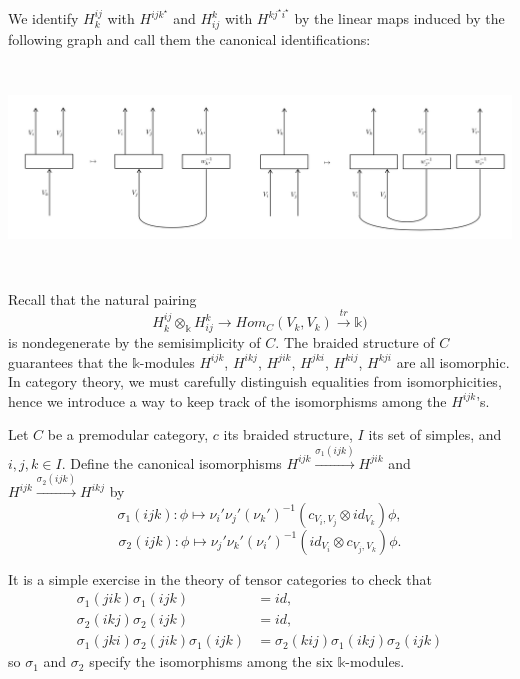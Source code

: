 \noindent We identify $H_{k}^{ij}$ with $H^{ijk^{\star}}$ and
$H_{ij}^{k}$ with $H^{kj^{\star}i^{\star}}$ by the linear maps
induced by the following graph and call them the canonical
identifications:
\begin{center}
  \includegraphics[height=5.5cm]{identification}
\end{center}
\noindent Recall that the natural pairing
$$H^{ij}_{k} \otimes_{\mathbb{k}} H_{ij}^{k} \to Hom_{C}(V_{k},V_{k}) \xrightarrow{tr} \mathbb{k})$$
is nondegenerate by the semisimplicity of $C$. The braided
structure of $C$ guarantees that the $\mathbb{k}$-modules
$H^{ijk}$, $H^{ikj}$, $H^{jik}$, $H^{jki}$, $H^{kij}$, $H^{kji}$
are all isomorphic. In category theory, we must carefully
distinguish equalities from isomorphicities, hence we introduce a
way to keep track of the isomorphisms among the $H^{ijk}$'s.

\begin{definition}\label{def/canonical-isomorphism}
  Let $C$ be a premodular category, $c$ its braided structure,
  $I$ its set of simples, and $i,j,k \in I$. Define the
  canonical isomorphisms
  $H^{ijk} \xrightarrow{\sigma_{1}(ijk)} H^{jik}$ and
  $H^{ijk} \xrightarrow{\sigma_{2}(ijk)} H^{ikj}$ by
  $$\sigma_{1}(ijk): \phi \mapsto \nu_{i}'\nu_{j}'(\nu_{k}')^{-1}(c_{V_{i}, V_{j}} \otimes id_{V_{k}})\phi,$$
  $$\sigma_{2}(ijk): \phi \mapsto \nu_{j}'\nu_{k}'(\nu_{i}')^{-1}(id_{V_{i}} \otimes c_{V_{j}, V_{k}})\phi.$$
\end{definition}

\noindent It is a simple exercise in the theory of tensor
categories to check that
\begin{equation} \label{eq1}
  \begin{split}
    \sigma_{1}(jik)\sigma_{1}(ijk) & = id, \\
    \sigma_{2}(ikj)\sigma_{2}(ijk) & = id, \\
    \sigma_{1}(jki)\sigma_{2}(jik)\sigma_{1}(ijk) & = \sigma_{2}(kij)\sigma_{1}(ikj)\sigma_{2}(ijk)
  \end{split}
\end{equation}
so $\sigma_{1}$ and $\sigma_{2}$ specify the isomorphisms among
the six $\mathbb{k}$-modules.

